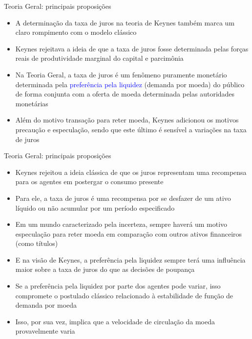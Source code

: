 \documentclass[10pt]{beamer}
\begin{document}
\begin{frame}{Teoria Geral: principais proposições}
    \begin{itemize}
        \item A determinação da taxa de juros na teoria de Keynes também marca um claro rompimento com o modelo clássico
        \bigskip
        \item Keynes rejeitava a ideia de que a taxa de juros fosse determinada pelas forças reais de produtividade marginal do capital e parcimônia
        \bigskip
        \item Na Teoria Geral, a taxa de juros é um fenômeno puramente monetário determinada pela \textcolor{blue}{preferência pela liquidez} (demanda por moeda) do público de forma conjunta com a oferta de moeda determinada pelas autoridades monetárias
        \bigskip
        \item Além do motivo transação para reter moeda, Keynes adicionou os motivos precaução e especulação, sendo que este último é sensível a variações na taxa de juros
    \end{itemize}
\end{frame}

\begin{frame}{Teoria Geral: principais proposições}
    \begin{itemize}
        \item Keynes rejeitou a ideia clássica de que os juros representam uma recompensa para os agentes em postergar o consumo presente
        \bigskip
        \item Para ele, a taxa de juros é uma recompensa por se desfazer de um ativo líquido ou não acumular por um período especificado
        \bigskip
        \item Em um mundo caracterizado pela incerteza, sempre haverá um motivo especulação para reter moeda em comparação com outros ativos financeiros (como títulos)
        \bigskip
        \item E na visão de Keynes, a preferência pela liquidez sempre terá uma influência maior sobre a taxa de juros do que as decisões de poupança
        \bigskip
        \item Se a preferência pela liquidez por parte dos agentes pode variar, isso compromete o postulado clássico relacionado à estabilidade de função de demanda por moeda
        \bigskip
        \item Isso, por sua vez, implica que a velocidade de circulação da moeda provavelmente varia
    \end{itemize}
\end{frame}
\end{document}

